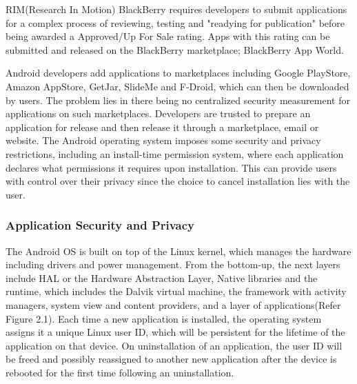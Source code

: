 RIM(Research In Motion) BlackBerry requires developers to submit applications for a complex process of reviewing, testing and "readying for publication" before being awarded a Approved/Up For Sale rating. Apps with this rating can be submitted and released on the BlackBerry marketplace; BlackBerry App World.\cite{j} 
\smallskip

Android developers add applications to marketplaces including Google PlayStore, Amazon AppStore, GetJar, SlideMe and F-Droid, which can then be downloaded by users. The problem lies in there being no centralized security measurement for applications on such marketplaces. Developers are trusted to prepare an application for release and then release it through a marketplace, email or website.\cite{g} The Android operating system imposes some security and privacy restrictions, including an install-time permission system, where each application declares what permissions it requires upon installation.\cite{h} This can provide users with control over their privacy since the choice to cancel installation lies with the user.

\subsubsection{Application Security and Privacy}
The Android OS is built on top of the Linux kernel, which manages the hardware including drivers and power management. From the bottom-up, the next layers include HAL or the Hardware Abstraction Layer, Native libraries and the runtime, which includes the Dalvik virtual machine, the framework with activity managers, system view and content providers, and a layer of applications(Refer Figure 2.1). Each time a new application is installed, the operating system assigns it a unique Linux user ID, which will be persistent for the lifetime of the application on that device. On uninstallation of an application, the user ID will be freed and possibly reassigned to another new application after the device is rebooted for the first time following an uninstallation.
\smallskip 


